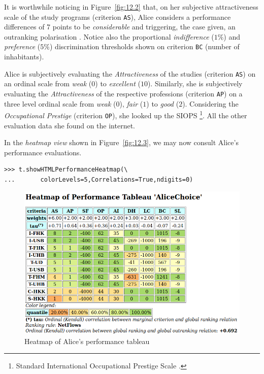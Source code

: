 It is worthwhile noticing in Figure~\vref{fig:12.2} that, on her subjective attractiveness scale of the study programs (criterion \texttt{AS}), Alice considers a performance differences of 7 points to be \emph{considerable} and triggering, the case given, an outranking polarisation \citep{BIS-2013}. Notice also the proportional \emph{indifference} ($1\%$) and \emph{preference} ($5\%$) discrimination thresholds shown on criterion \texttt{BC} (number of inhabitants).

Alice is subjectively evaluating the \emph{Attractiveness} of the studies (criterion \texttt{AS}) on an ordinal scale from \emph{weak} ($0$) to \emph{excellent} ($10$). Similarly, she is subjectively evaluating the \emph{Attractiveness} of the respective professions (criterion \texttt{AP}) on a three level ordinal scale from \emph{weak} ($0$), \emph{fair} ($1$) to \emph{good} ($2$). Considering the \emph{Occupational Prestige} (criterion \texttt{OP}), she looked up the SIOPS \footnote{Standard International Occupational Prestige Scale \citep*{GAN-1996}.}. All the other evaluation data she found on the internet.

In the \emph{heatmap view} shown in Figure~\vref{fig:12.3}, we may now consult Alice's performance evaluations.
\begin{lstlisting}
>>> t.showHTMLPerformanceHeatmap(\
...       colorLevels=5,Correlations=True,ndigits=0)
\end{lstlisting}
\begin{figure}[ht]
\includegraphics[width=\hsize]{Figures/12-3-aliceHeatmap.png}
\caption{Heatmap of Alice's performance tableau}
\label{fig:12.3}       %
\end{figure}

